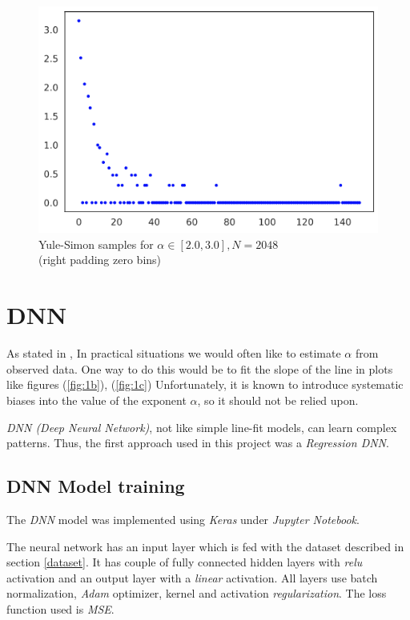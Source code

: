 \documentclass[a4paper, 12pt]{report}
\begin{document}
\begin{figure}[h]
\centering
\includegraphics[width=0.7\linewidth]{./dataset-zeros}
\caption[Yule-Simon log-scale with zero padding]{Yule-Simon samples for $\alpha\in[2.0,3.0], N=2048$ \\(right padding zero bins)}
\label{fig:3}
\end{figure}

\pagebreak
\section{DNN}
\par As stated in \cite{newman}, In practical situations we would often like to estimate $\alpha$ from observed data. One way to do this would be to fit the slope of the line in plots like figures (\ref{fig:1b}), (\ref{fig:1c}) Unfortunately, it is known to introduce systematic biases into the value of the exponent $\alpha$, so it should not be relied
upon.

\par \textit{DNN (Deep Neural Network)}, not like simple line-fit models, can learn complex patterns. Thus, the first approach used in this project was a \textit{Regression DNN}.

\subsection{DNN Model training}
The \textit{DNN} model was implemented using \textit{Keras} under \textit{Jupyter Notebook}.

\par The neural network has an input layer which is fed with the dataset described in section \ref{dataset}. It has couple of fully connected hidden layers with \textit{relu} activation and an output layer with a \textit{linear} activation. All layers use batch normalization, \textit{Adam} optimizer, kernel and activation \textit{regularization}. The loss function used is \textit{MSE}.
\end{document}
